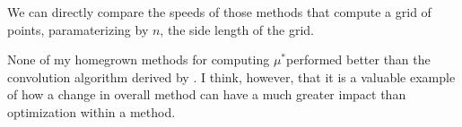 \documentclass[]{article}
\newcommand{\mustar}{\ensuremath{\mu^* }}
\begin{document}
We can directly compare the speeds of those methods that compute a grid of points, paramaterizing by $n$, the side length of the grid. 

None of my homegrown methods for computing \mustar performed better than the convolution algorithm derived by \citeauthor{stat}. I think, however, that it is a valuable example of how a change in overall method can have a much greater impact than optimization within a method. 










	

\printbibliography
\end{document}

